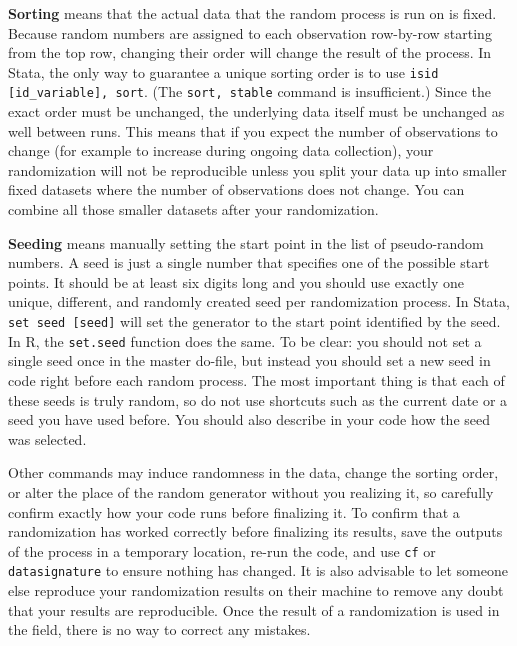 \textbf{Sorting} means that the actual data that the random process is run on is fixed.
Because random numbers are assigned to each observation row-by-row starting from
the top row,
changing their order will change the result of the process.
In Stata, the only way to guarantee a unique sorting order is to use
\texttt{isid [id\_variable], sort}.
(The \texttt{sort, stable} command is insufficient.)
Since the exact order must be unchanged,
the underlying data itself must be unchanged as well between runs.
This means that if you expect the number of observations to change
(for example to increase during ongoing data collection),
your randomization will not be reproducible unless you split your data up into
smaller fixed datasets where the number of observations does not change.
You can combine all
those smaller datasets after your randomization.


\textbf{Seeding} means manually setting the start point in the list of pseudo-random numbers.
A seed is just a single number that specifies one of the possible start points.
It should be at least six digits long and you should use exactly
one unique, different, and randomly created seed per randomization process.
In Stata, \texttt{set seed [seed]} will set the generator
to the start point identified by the seed.
In R, the \texttt{set.seed} function does the same.
To be clear: you should not set a single seed once in the master do-file,
but instead you should set a new seed in code right before each random process.
The most important thing is that each of these seeds is truly random,
so do not use shortcuts such as the current date or a seed you have used before.
You should also describe in your code how the seed was selected.

Other commands may induce randomness in the data,
change the sorting order,
or alter the place of the random generator without you realizing it,
so carefully confirm exactly how your code runs before finalizing it.
To confirm that a randomization has worked correctly before finalizing its results,
save the outputs of the process in a temporary location,
re-run the code, and use \texttt{cf} or \texttt{datasignature} to ensure
nothing has changed. It is also advisable to let someone else reproduce your
randomization results on their machine to remove any doubt that your results
are reproducible.
Once the result of a randomization is used in the field,
there is no way to correct any mistakes.

